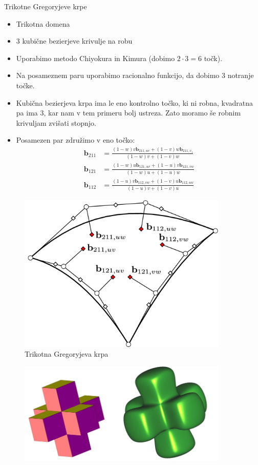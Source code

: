 \documentclass[a4paper,8pt]{beamer}
\newcommand{\tbf}{\textbf}
\begin{document}
\begin{frame}{Trikotne Gregoryjeve krpe}
	\begin{itemize}
		\item Trikotna domena
		\item 3 kubične bezierjeve krivulje na robu
		\item Uporabimo metodo Chiyokura in Kimura (dobimo $2 \cdot 3 = 6$ točk).
		\item Na posameznem paru uporabimo racionalno funkcijo, da dobimo 3 notranje točke.
		\item Kubična bezierjeva krpa ima le eno kontrolno točko, ki ni robna, kvadratna pa ima 3, kar nam v tem primeru bolj ustreza. Zato moramo še robnim krivuljam zvišati stopnjo.
		\item Posamezen par združimo v eno točko:
		\begin{align*}
		\tbf{b}_{211} &= \frac{(1-w)v \tbf{b}_{211,uv}+(1-v)w\tbf{b}_{211,v_1}}{(1-w)v+(1-v)w} \\
		\tbf{b}_{121} &= \frac{(1-w)u \tbf{b}_{121,uv}+(1-u)v\tbf{b}_{121,vw}}{(1-w)u+(1-u)w} \\
		\tbf{b}_{112} &= \frac{(1-u)v \tbf{b}_{112,vw}+(1-v)u\tbf{b}_{112,uw}}{(1-u)v+(1-v)u} 
		\end{align*}
	\end{itemize}
\end{frame}
\begin{frame}
	\begin{figure}[h]
		\centering
		\includegraphics[width=10cm]{gregory_krpe_trikotna.jpg}
		\caption{Trikotna Gregoryjeva krpa}
	\end{figure}
\end{frame}

\begin{frame}
	\begin{figure}[h]
		\centering
		\includegraphics[width=10cm]{posebna_kocka.jpg}
	\end{figure}
\end{frame}
\end{document}
